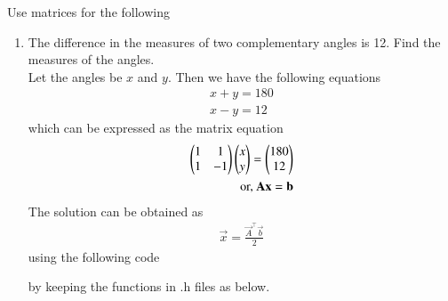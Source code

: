 Use matrices for the following
\begin{enumerate}[label=\thesubsection.\arabic*, ref=\thesubsection.\theenumi,resume*]
	\item The difference in the measures of two complementary angles is 12\degree. Find the measures of the angles.
		\\
		\solution Let the angles be $x$ and $y$.  Then we have the following equations
		\begin{align}
			x+y = 180
			\\
			x-y = 12
		\end{align}
		which can be expressed as the matrix equation
		\begin{align}
		\begin{pmatrix}1 & 1 \\ 1 & -1\end{pmatrix}\begin{pmatrix}x\\y\end{pmatrix}= \begin{pmatrix}180 \\ 12\end{pmatrix}
		\\
		\text{or, } \mathbf{A}\mathbf{x} = \mathbf{b}
		\end{align}
		The solution can be obtained as
		\begin{align}
			\vec{x} = \frac{\vec{A}^{\top}\vec{b}}{2}
		\end{align}
		using the following code
	
	by keeping the functions in .h files as below.  
	
	
\end{enumerate}
